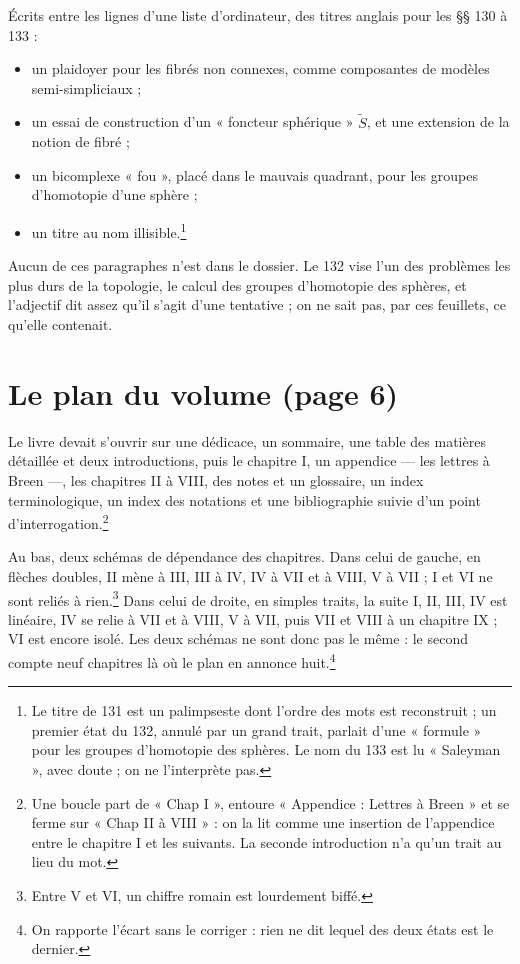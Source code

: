\documentclass[11pt,a4paper]{article}
\begin{document}
Écrits entre les lignes d'une liste d'ordinateur, des titres anglais pour les
§§ 130 à 133 :
\begin{itemize}
\item[130.] un plaidoyer pour les fibrés non connexes, comme composantes de
modèles semi-simpliciaux ;
\item[131.] un essai de construction d'un « foncteur sphérique »
$\tilde{S}$, et une extension de la notion de fibré ;
\item[132.] un bicomplexe « fou », placé dans le mauvais quadrant, pour les
groupes d'homotopie d'une sphère ;
\item[133.] un titre au nom illisible.\footnote{Le titre de 131 est un
palimpseste dont l'ordre des mots est reconstruit ; un premier état du 132,
annulé par un grand trait, parlait d'une « formule » pour les groupes
d'homotopie des sphères. Le nom du 133 est lu « Saleyman », avec doute ; on
ne l'interprète pas.}
\end{itemize}
Aucun de ces paragraphes n'est dans le dossier. Le 132 vise l'un des
problèmes les plus durs de la topologie, le calcul des groupes d'homotopie
des sphères, et l'adjectif dit assez qu'il s'agit d'une tentative ; on ne
sait pas, par ces feuillets, ce qu'elle contenait.

\section*{Le plan du volume (page 6)}

Le livre devait s'ouvrir sur une dédicace, un sommaire, une table des matières
détaillée et deux introductions, puis le chapitre I, un appendice --- les
lettres à Breen ---, les chapitres II à VIII, des notes et un glossaire, un
index terminologique, un index des notations et une bibliographie suivie d'un
point d'interrogation.\footnote{Une boucle part de « Chap I », entoure
« Appendice : Lettres à Breen » et se ferme sur « Chap II à VIII » : on la lit
comme une insertion de l'appendice entre le chapitre I et les suivants. La
seconde introduction n'a qu'un trait au lieu du mot.}

Au bas, deux schémas de dépendance des chapitres. Dans celui de gauche, en
flèches doubles, II mène à III, III à IV, IV à VII et à VIII, V à VII ; I et
VI ne sont reliés à rien.\footnote{Entre V et VI, un chiffre romain est
lourdement biffé.} Dans celui de droite, en simples traits, la suite I, II,
III, IV est linéaire, IV se relie à VII et à VIII, V à VII, puis VII et VIII
à un chapitre IX ; VI est encore isolé. Les deux schémas ne sont donc pas le
même : le second compte neuf chapitres là où le plan en annonce
huit.\footnote{On rapporte l'écart sans le corriger : rien ne dit lequel des
deux états est le dernier.}
\end{document}
